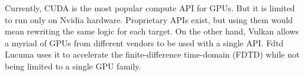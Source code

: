 \documentclass[../main.tex]{subfiles}
\begin{document}
\newpage
{}


Currently, CUDA is the most popular compute API for GPUs.
But it is limited to run only on Nvidia hardware.
Proprietary APIs exist, but using them would mean rewriting the same logic for each target.
On the other hand, Vulkan allows a myriad of GPUs from different vendors to be used with a single API.
Fdtd Lucuma uses it to accelerate the finite-difference time-domain (FDTD) while not being limited to a single GPU family.
\end{document}
